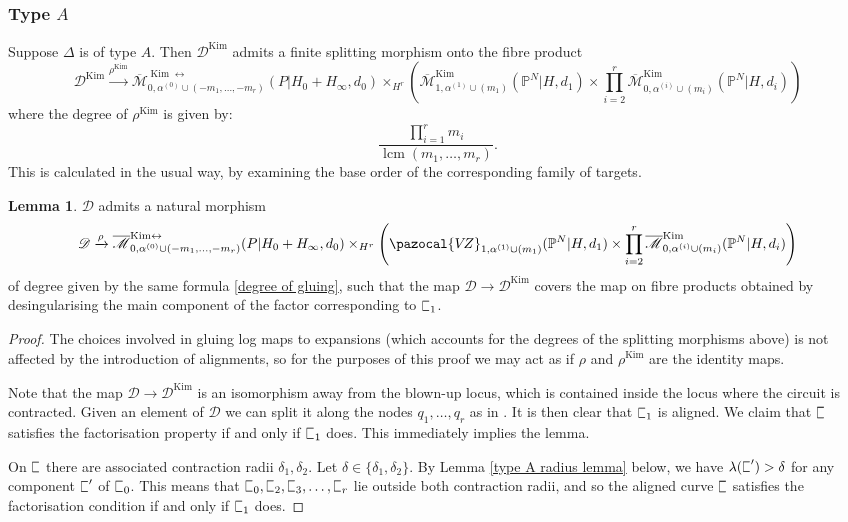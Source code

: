 \documentclass[11pt]{amsart}
\newcommand{\lcm}{\operatorname{lcm}}
\newcommand{\sqC}{\scalebox{0.8}[1.3]{$\sqsubset$}}
\newcommand{\Kim}{\operatorname{Kim}}
\newcommand{\PP}{\mathbb P}
\newcommand{\VZ}{\pazocal{V\!Z}}
\renewcommand{\to}{\rightarrow}
\newcommand{\Mcal}{\mathcal{M}}
\newcommand{\Dcal}{\mathcal{D}}
\newcommand{\ol}[1]{\overline{#1}}
\theoremstyle{definition}
\newtheorem{lemma}[thm]{Lemma}
\theoremstyle{definition}
\begin{document}
\subsubsection{Type $A$}\label{subsubsection type A} Suppose $\Delta$ is of type $A$. Then \cite[\S 7]{ChenDegeneration} $\Dcal^{\Kim}$ admits a finite splitting morphism onto the fibre product
\begin{equation*} \Dcal^{\Kim} \xrightarrow{\rho^{\Kim}} \ol\Mcal^{\Kim \leftrightarrow}_{0,\alpha^{(0)}\cup (-m_1,\ldots,-m_r)}(P|H_0+H_\infty,d_0)\times_{H^r}\left( \ol\Mcal^{\Kim}_{1,\alpha^{(1)}\cup(m_1)}(\PP^N|H,d_1) \times \prod_{i=2}^r \ol\Mcal^{\Kim}_{0,\alpha^{(i)}\cup(m_i)}(\PP^N|H,d_i) \right) \end{equation*}
where the degree of $\rho^{\Kim}$ is given by:
\begin{equation} \label{degree of gluing} \dfrac{\prod_{i=1}^r m_i}{\lcm(m_1,\ldots,m_r)}. \end{equation}
This is calculated in the usual way, by examining the base order of the corresponding family of targets.

\begin{lemma} \label{Lemma type A gluing} $\Dcal$ admits a natural morphism
\begin{equation*}\Dcal \xrightarrow{\rho} \ol\Mcal^{\Kim \leftrightarrow}_{0,\alpha^{(0)}\cup (-m_1,\ldots,-m_r)}(P|H_0+H_\infty,d_0)\times_{H^r}\left(\VZ_{1,\alpha^{(1)}\cup(m_1)}(\PP^N|H,d_1)\times\prod_{i=2}^r \ol\Mcal^{\Kim}_{0,\alpha^{(i)}\cup(m_i)}(\PP^N|H,d_i)\right) \end{equation*}
of degree given by the same formula \eqref{degree of gluing}, such that the map $\Dcal \to \Dcal^{\Kim}$ covers the map on fibre products obtained by desingularising the main component of the factor corresponding to $\sqC_1$.\end{lemma}

\begin{proof}
The choices involved in gluing log maps to expansions (which accounts for the degrees of the splitting morphisms above) is not affected by the introduction of alignments, so for the purposes of this proof we may act as if $\rho$ and $\rho^{\Kim}$ are the identity maps.

Note that the map $\Dcal\to\Dcal^{\Kim}$ is an isomorphism away from the blown-up locus, which is contained inside the locus where the circuit is contracted. Given an element of $\Dcal$ we can split it along the nodes $q_1,\ldots,q_r$ as in \cite{}. It is then clear that $\sqC_1$ is aligned. We claim that $\sqC$ satisfies the factorisation property if and only if $\sqC_1$ does. This immediately implies the lemma.

On $\sqC$ there are associated contraction radii $\delta_1,\delta_2$. Let $\delta \in \{\delta_1,\delta_2\}$. By Lemma \ref{type A radius lemma} below, we have $\lambda(\sqC^\prime) > \delta$ for any component $\sqC^\prime$ of $\sqC_0$. This means that $\sqC_0,\sqC_2,\sqC_3,\ldots,\sqC_r$ lie outside both contraction radii, and so the aligned curve $\sqC$ satisfies the factorisation condition if and only if $\sqC_1$ does. \end{proof}
\end{document}
